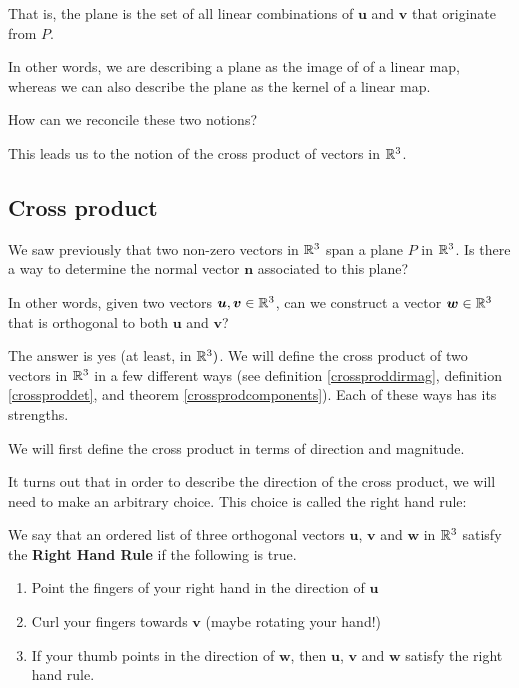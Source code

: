     That is, the plane is the set of all linear combinations of $\bm{u}$ and $\bm{v}$ that originate from $P$.

    \begin{remark}
    In other words, we are describing a plane as the image of of a linear map, whereas we can also describe the plane as the kernel of a linear map.
    \end{remark}


\begin{motivating}
How can we reconcile these two notions?
\end{motivating}

This leads us to the notion of the cross product of vectors in $\mathbb{R}^3$.




\subsection{Cross product}

We saw previously that two non-zero vectors in $\mathbb{R}^3$ span a plane $P$ in $\mathbb{R}^3$.  Is there a way to determine the normal vector $\bm{n}$ associated to this plane?

\begin{motivating}

In other words, given two vectors $\bm{u}, \bm{v} \in \mathbb{R}^3$, can we construct a vector $\bm{w} \in \mathbb{R}^3$ that is orthogonal to both $\bm{u}$ and $\bm{v}$?
\end{motivating} 

The answer is yes (at least, in $\mathbb{R}^3)$. We will define the cross product of two vectors in $\mathbb{R}^3$ in a few different ways (see definition \ref{crossproddirmag}, definition \ref{crossproddet}, and theorem \ref{crossprodcomponents}).  Each of these ways has its strengths.

We will first define the cross product in terms of direction and magnitude.

It turns out that in order to describe the direction of the cross product, we will need to make an arbitrary choice. This choice is called the right hand rule: 

\begin{definition}
    We say that an ordered list of three orthogonal vectors $\bm{u}$, $\bm{v}$ and $\bm{w}$ in $\mathbb{R}^3$ satisfy the \textbf{Right Hand Rule} if the following is true.
    
    \begin{enumerate}
        \item Point the fingers of your right hand in the direction of $\bm{u}$
        \item Curl your fingers towards $\bm{v}$ (maybe rotating your hand!)
        \item If your thumb points in the direction of $\bm{w}$, then $\bm{u}$, $\bm{v}$ and $\bm{w}$ satisfy the right hand rule.
    \end{enumerate}
    
    \end{definition}


